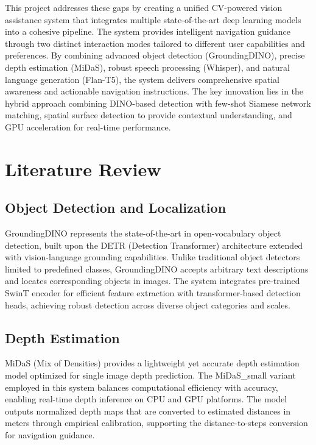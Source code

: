 \documentclass{article}
\begin{document}
This project addresses these gaps by creating a unified CV-powered vision assistance system that integrates multiple state-of-the-art deep learning models into a cohesive pipeline. The system provides intelligent navigation guidance through two distinct interaction modes tailored to different user capabilities and preferences. By combining advanced object detection (GroundingDINO), precise depth estimation (MiDaS), robust speech processing (Whisper), and natural language generation (Flan-T5), the system delivers comprehensive spatial awareness and actionable navigation instructions. The key innovation lies in the hybrid approach combining DINO-based detection with few-shot Siamese network matching, spatial surface detection to provide contextual understanding, and GPU acceleration for real-time performance.

\section{Literature Review}

\subsection{Object Detection and Localization}

GroundingDINO represents the state-of-the-art in open-vocabulary object detection, built upon the DETR (Detection Transformer) architecture extended with vision-language grounding capabilities. Unlike traditional object detectors limited to predefined classes, GroundingDINO accepts arbitrary text descriptions and locates corresponding objects in images. The system integrates pre-trained SwinT encoder for efficient feature extraction with transformer-based detection heads, achieving robust detection across diverse object categories and scales.

\subsection{Depth Estimation}

MiDaS (Mix of Densities) provides a lightweight yet accurate depth estimation model optimized for single image depth prediction. The MiDaS\_small variant employed in this system balances computational efficiency with accuracy, enabling real-time depth inference on CPU and GPU platforms. The model outputs normalized depth maps that are converted to estimated distances in meters through empirical calibration, supporting the distance-to-steps conversion for navigation guidance.
\end{document}
